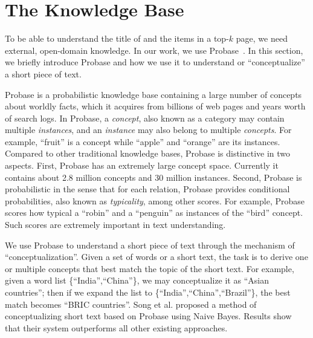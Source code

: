 \section{The Knowledge Base}
\label{sec:prelim}

To be able to understand the title of and the items in a top-$k$ page,
we need external, open-domain knowledge. In our work, we use
Probase~\cite{WuLWZ12:Probase}. In this section, we briefly introduce
Probase and how we use it to understand or ``conceptualize'' a short
piece of text.

Probase is a probabilistic knowledge base containing a large number
of concepts about worldly facts, which it acquires from billions of web
pages and years worth of search logs.  In Probase, a \emph{concept},
also known as a category may contain multiple \emph{instances},
and an \emph{instance} may also belong to multiple \emph{concepts}.
For example, ``fruit'' is a concept while ``apple'' and ``orange'' are
its instances.  Compared to other traditional knowledge bases, Probase
is distinctive in two aspects.  First, Probase has an extremely large
concept space. Currently it contains about 2.8 million concepts and 30
million instances.  Second, Probase is probabilistic in the sense that
for each relation, Probase provides conditional probabilities, also known as
\emph{typicality}, among other scores.  
For example, Probase scores how typical a ``robin'' and a
``penguin'' as instances of the ``bird'' concept. Such scores are
extremely important in text understanding.

We use Probase to understand a short piece of text through the
mechanism of ``conceptualization''.  Given a set of words or a short
text, the task is to derive one or multiple concepts that best match
the topic of the short text.  For example, given a word list
\{``India'',``China''\}, we may conceptualize it as ``Asian
countries''; then if we expand the list to
\{``India'',``China'',``Brazil''\}, the best match becomes ``BRIC
countries''.  Song et al. \cite{Song11:Conceptualize} proposed a
method of conceptualizing short text based on Probase using Naive
Bayes.  
Results show that their system
outperforms all other existing approaches\cite{blei2003latent,wordnet,gabrilovich2006overcoming}.

